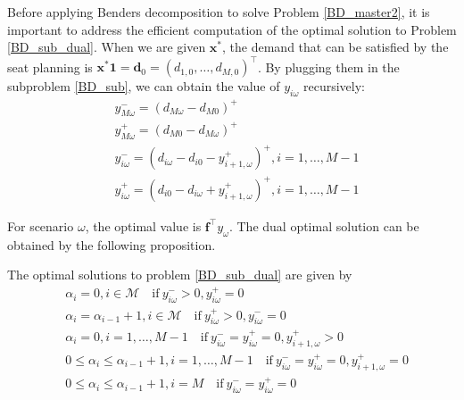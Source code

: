 Before applying Benders decomposition to solve Problem \eqref{BD_master2}, it is important to address the efficient computation of the optimal solution to Problem \eqref{BD_sub_dual}.
When we are given $\mathbf{x}^{*}$, the demand that can be satisfied by the seat planning is $\mathbf{x}^{*} \mathbf{1} = \mathbf{d}_0 = (d_{1,0},\ldots,d_{M,0})^{\intercal}$.
By plugging them in the subproblem \eqref{BD_sub}, we can obtain the value of $y_{i \omega}$ recursively:
\begin{equation}\label{y_recursively}
\begin{aligned}
  & y_{M \omega}^{-}=\left(d_{M \omega}-d_{M 0}\right)^{+} \\
  & y_{M \omega}^{+}=\left(d_{M 0}-d_{M \omega}\right)^{+} \\
  & y_{i \omega}^{-}=\left(d_{i \omega}-d_{i 0} - y_{i+1, \omega}^{+} \right)^{+}, i =1,\ldots, M-1 \\
  & y_{i \omega}^{+}=\left(d_{i 0}- d_{i \omega} + y_{i+1, \omega}^{+}\right)^{+}, i =1,\ldots, M-1
\end{aligned}
\end{equation}

For scenario $\omega$, the optimal value is $\mathbf{f}^{\intercal} y_{\omega}$. The dual optimal solution can be obtained by the following proposition.

\begin{prop}\label{optimal_sol_sub_dual}
  The optimal solutions to problem \eqref{BD_sub_dual} are given by 
\begin{equation}\label{BD_sub_simplified}
  \begin{aligned}
    & \alpha_{i} = 0, i \in \mathcal{M} \quad \text{if}~  y_{i \omega}^{-} > 0,  y_{i \omega}^{+} = 0   \\
    & \alpha_{i} = \alpha_{i-1}+1, i \in \mathcal{M} \quad \text{if}~ y_{i \omega}^{+} > 0,  y_{i \omega}^{-} = 0 \\
    & \alpha_{i} = 0, i =1,\ldots, M-1 \quad \text{if}~ y_{i \omega}^{-} = y_{i \omega}^{+} = 0, y_{i+1, \omega}^{+}> 0 \\
    & 0 \leq \alpha_{i} \leq \alpha_{i-1}+1, i =1,\ldots, M-1 \quad \text{if}~ y_{i \omega}^{-} = y_{i \omega}^{+} = 0, y_{i+1, \omega}^{+}= 0 \\
    & 0 \leq \alpha_{i} \leq \alpha_{i-1}+1, i = M \quad \text{if}~ y_{i \omega}^{-} = y_{i \omega}^{+} = 0
  \end{aligned}
\end{equation}
\end{prop}

